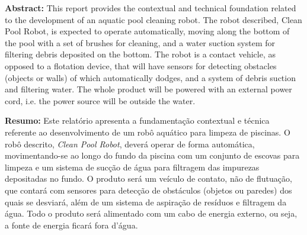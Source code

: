 \begin{abstractenv}
\textbf{Abstract:} This report provides the contextual and technical foundation
related to the development of an aquatic pool cleaning robot. The robot
described, Clean Pool Robot, is expected to operate automatically, moving along
the bottom of the pool with a set of brushes for cleaning, and a water suction
system for filtering debris deposited on the bottom. The robot is a contact
vehicle, as opposed to a flotation device, that will have sensors for detecting
obstacles (objects or walls) of which automatically dodges, and a system of
debris suction and filtering  water. The whole product will be powered with an
external power cord, i.e.  the power source will be outside the water.
\end{abstractenv}


\begin{abstractenv}
\textbf{Resumo:} Este relatório apresenta a fundamentação contextual e técnica
referente ao desenvolvimento de um robô aquático para limpeza de piscinas.
O robô descrito, \textit{Clean Pool Robot}, deverá operar de forma automática, 
movimentando-se ao longo do fundo da piscina com um conjunto de escovas para 
limpeza e um sistema de sucção de água para filtragem das impurezas depositadas 
no fundo. O produto será um veículo de contato, não de flutuação, que contará 
com sensores para detecção de obstáculos (objetos ou paredes) dos quais se 
desviará, além de um sistema de aspiração de resíduos e filtragem da água. Todo 
o produto será alimentado com um cabo de energia externo, ou seja, a fonte de 
energia ficará fora d’água.
\end{abstractenv}
